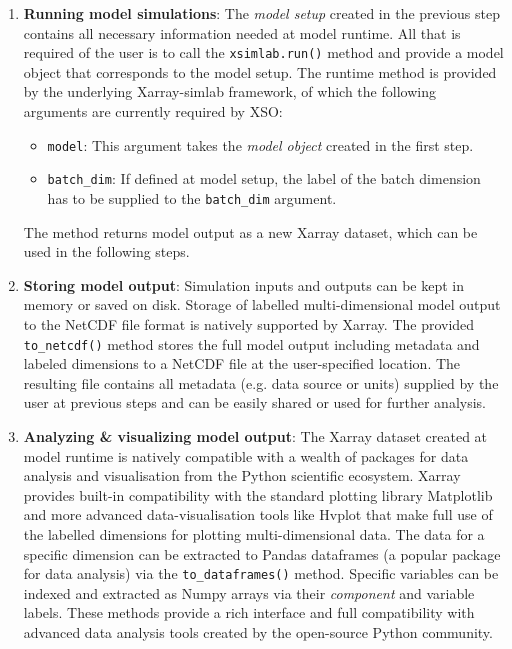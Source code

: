 \documentclass[journal abbreviation, manuscript]{copernicus}
\begin{document}
\begin{enumerate}
    \item \textbf{Running model simulations}:
    The \textit{model setup} created in the previous step contains all necessary information needed at model runtime. All that is required of the user is to call the \texttt{xsimlab.run()} method and provide a model object that corresponds to the model setup. The runtime method is provided by the underlying Xarray-simlab framework, of which the following arguments are currently required by XSO:
    \begin{itemize}
        \item \texttt{model}: This argument takes the \textit{model object} created in the first step.
        \item \texttt{batch\_dim}: If defined at model setup, the label of the batch dimension has to be supplied to the \texttt{batch\_dim} argument.
    \end{itemize}
    The method returns model output as a new Xarray dataset, which can be used in the following steps.
    
    \item \textbf{Storing model output}: 
    Simulation inputs and outputs can be kept in memory or saved on disk. Storage of labelled multi-dimensional model output to the NetCDF file format is natively supported by Xarray. The provided \texttt{to\_netcdf()} method stores the full model output including metadata and labeled dimensions to a NetCDF file at the user-specified location. The resulting file contains all metadata (e.g. data source or units) supplied by the user at previous steps and can be easily shared or used for further analysis. 
    
    \item \textbf{Analyzing & visualizing model output}:
    The Xarray dataset created at model runtime is natively compatible with a wealth of packages for data analysis and visualisation from the Python scientific ecosystem. Xarray provides built-in compatibility with the standard plotting library Matplotlib and more advanced data-visualisation tools like Hvplot that make full use of the labelled dimensions for plotting multi-dimensional data. The data for a specific dimension can be extracted to Pandas dataframes (a popular package for data analysis) via the \texttt{to\_dataframes()} method. Specific variables can be indexed and extracted as Numpy arrays via their \textit{component} and variable labels. These methods provide a rich interface and full compatibility with advanced data analysis tools created by the open-source Python community.

\end{enumerate}
\end{document}
